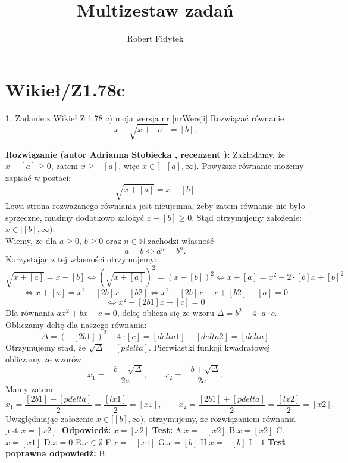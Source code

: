 \documentclass[12pt, a4paper]{article}
\title{Multizestaw zadań}
\author{Robert Fidytek}
\date{}
\theoremstyle{definition} %
\newtheorem{zad}{}
\newcommand{\kategoria}[1]{\section{#1}} %
\newcommand{\zadStart}[1]{\begin{zad}#1\newline} %
\newcommand{\zadStop}{\end{zad}}   %
\newcommand{\rozwStart}[2]{\noindent \textbf{Rozwiązanie (autor #1 , recenzent #2): }\newline} %
\newcommand{\rozwStop}{\newline}                                            %
\newcommand{\odpStart}{\noindent \textbf{Odpowiedź:}\newline}    %
\newcommand{\odpStop}{\newline}                                             %
\newcommand{\testStart}{\noindent \textbf{Test:}\newline} %
\newcommand{\testStop}{\newline} %
\newcommand{\kluczStart}{\noindent \textbf{Test poprawna odpowiedź:}\newline} %
\newcommand{\kluczStop}{\newline} %
\begin{document}
\maketitle


\kategoria{Wikieł/Z1.78c}
\zadStart{Zadanie z Wikieł Z 1.78 c) moja wersja nr [nrWersji]}
Rozwiązać równanie
$$x-\sqrt{x+[a]}=[b].$$
\zadStop
\rozwStart{Adrianna Stobiecka}{}
Zakładamy, że $x+[a]\geq0$, zatem $x\geq-[a]$, więc $x\in[-[a],\infty)$. Powyższe równanie możemy zapisać w postaci:
$$\sqrt{x+[a]}=x-[b]$$
Lewa strona rozważanego równiania jest nieujemna, żeby zatem równanie nie było sprzeczne, musimy dodatkowo założyć $x-[b]\geq0$. Stąd otrzymujemy założenie: $x\in[[b],\infty)$.
\\Wiemy, że dla $a\geq0$, $b\geq0$ oraz $n\in\mathbb{N}$ zachodzi własność
$$a=b\Leftrightarrow a^n=b^n.$$ 
Korzystając z tej własności otrzymujemy:
$$\sqrt{x+[a]}=x-[b]\Leftrightarrow(\sqrt{x+[a]})^2=(x-[b])^2\Leftrightarrow x+[a]=x^2-2\cdot[b]x+[b]^2$$
$$\Leftrightarrow x+[a]=x^2-[2b]x+[b2]\Leftrightarrow x^2-[2b]x-x+[b2]-[a]=0$$
$$\Leftrightarrow x^2-[2b1]x+[c]=0$$
Dla równania $ax^2+bx+c=0$, deltę oblicza się ze wzoru $\Delta=b^2-4\cdot a\cdot c$. Obliczamy deltę dla naszego równania:
$$\Delta=(-[2b1])^2-4\cdot[c]=[delta1]-[delta2]=[delta]$$
Otrzymujemy stąd, że $\sqrt{\Delta}=[pdelta]$. Pierwiastki funkcji kwadratowej obliczamy ze wzorów
$$x_1=\frac{-b-\sqrt{\Delta}}{2a},\qquad x_2=\frac{-b+\sqrt{\Delta}}{2a}.$$ 
Mamy zatem
$$x_1=\frac{[2b1]-[pdelta]}{2}=\frac{[lx1]}{2}=[x1],\qquad x_2=\frac{[2b1]+[pdelta]}{2}=\frac{[lx2]}{2}=[x2].$$
Uwzględniając założenie $x\in[[b],\infty)$, otrzymujemy, że rozwiązaniem równania jest $x=[x2].$
\rozwStop
\odpStart
$x=[x2]$
\odpStop
\testStart
A.$x=-[x2]$
B.$x=[x2]$
C.$x=[x1]$
D.$x=0$
E.$x\in\emptyset$
F.$x=-[x1]$
G.$x=[b]$
H.$x=-[b]$
I.$-1$
\testStop
\kluczStart
B
\kluczStop
\end{document}
